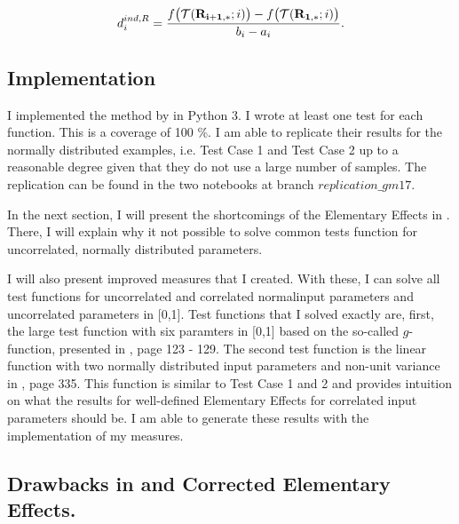 \documentclass[a4paper,12pt]{article}
\begin{document}
\begin{align}
d_i^{ind, R} = \frac{f\big(\mathcal{T}(\bold{R_{i+1,*}}; i)\big) - f\big(\mathcal{T}(\bold{R_{1,*}}; i)\big)}{b_i - a_i}.
\end{align}

\subsection{Implementation}

I implemented the method by \cite{ge2017extending} in Python 3. I wrote at least one test for each function. This is a coverage of 100 \%. I am able to replicate their results for the normally distributed examples, i.e. Test Case 1 and Test Case 2 up to a reasonable degree given that they do not use a large number of samples.
The replication can be found in the two notebooks at branch $\textit{replication\_gm17}$.

In the next section, I will present the shortcomings of the Elementary Effects in \cite{ge2017extending}. There, I will explain why it not possible to solve common tests function for uncorrelated, normally distributed parameters.

I will also present improved measures that I created. With these, I can solve all test functions for uncorrelated and correlated normalinput parameters and uncorrelated parameters in [0,1]. Test functions that I solved exactly are, first, the large test function with six paramters in [0,1] based on the so-called $g$-function, presented in \cite{Saltelli.2008}, page 123 - 129. The second test function is the linear function with two normally distributed input parameters and non-unit variance in \cite{Smith.2014}, page 335. This function is similar to Test Case 1 and 2 and provides intuition on what the results for well-defined Elementary Effects for correlated input parameters should be. I am able to generate these results with the implementation of my measures.

\subsection{Drawbacks in \cite{ge2017extending} and Corrected Elementary Effects.}
\end{document}
